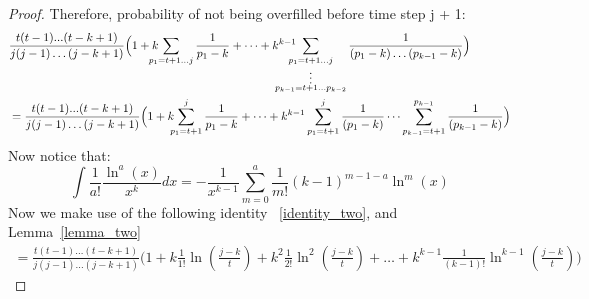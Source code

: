 \begin{proof}
Therefore, probability of not being overfilled before time step j + 1:
\begin{align}
    & \frac{t(t - 1)...(t - k + 1)}{j (j - 1) \dots (j - k + 1)} \Big(1 + k\hspace{-1em}\sum_{p_1 = t + 1\dots j}^{}\frac{1}{p_1 - k} + \dots
    + {k^{k - 1}}\hspace{-2em}\sum_{\substack{p_1 = t + 1 \dots j \\\vdots\\ p_{k-1} = t + 1 \dots p_{k-2}}}\frac{1}{(p_1 - k)\dots (p_{k-1} - k)} \Big)\\
    & = 
    \frac{t(t - 1)...(t - k + 1)}{j (j - 1) \dots (j - k + 1)} \Big(1 + k\hspace{-0.5 em}\sum_{p_1 = t + 1}^{j}\frac{1}{p_1 - k} + 
     \dots  +
     {k^{k - 1}}\sum_{p_1 = t + 1}^{j}\frac{1}{ (p_{1} - k)} \dots \sum_{p_{k-1} = t + 1}^{p_{k-1}}\frac{1}{ (p_{k-1} - k)} \Big) 
\end{align}
Now notice that:
\begin{equation}
    \label{identity_two}
    \int\frac{1}{a!} \frac{\ln^a(x)}{x^k} dx = - \frac{1}{x^{k - 1}}\sum_{m = 0}^{a}\frac{1}{m!}(k -1)^{m - 1 -a }\ln^m(x)
\end{equation}
Now we make use of the following identity ~\eqref{identity_two}, 
 and Lemma~\ref{lemma_two}
\begin{align}
 = 
     \frac{t(t - 1)\dots (t - k + 1)}{j(j - 1)\dots(j - k + 1)}(1 + {k}\frac{1}{1!}\ln (\frac{j - k}{t}) + {k^2}\frac{1}{2!}\ln^2(\frac{j - k}{t}) + \dots + {k^{k - 1}}\frac{1}{(k-1)!}\ln^{k - 1}(\frac{j - k}{t})\Big)
\end{align}


\end{proof}
